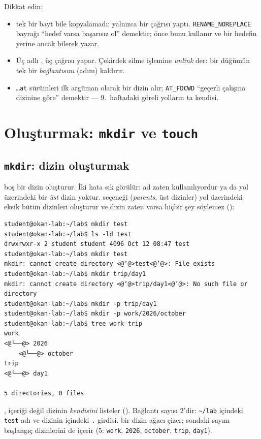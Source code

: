 Dikkat edin:
\begin{itemize}
  \item {} tek bir bayt bile kopyalamadı: yalnızca bir  çağrısı yaptı. \texttt{RENAME\_NOREPLACE} bayrağı ``hedef varsa başarısız ol'' demektir;  önce bunu kullanır ve bir hedefin yerine ancak bilerek yazar.
  \item Üç adlı , üç  çağrısı yapar. Çekirdek silme işlemine \emph{unlink} der: bir düğümün tek bir \emph{bağlantısını} (adını) kaldırır.
  \item \texttt{\dots at} sürümleri ilk argüman olarak bir dizin alır; \texttt{AT\_FDCWD} ``geçerli çalışma dizinine göre'' demektir --- 9.~haftadaki göreli yolların ta kendisi.
\end{itemize}

\section{Oluşturmak: \texttt{mkdir} ve \texttt{touch}}

\subsection{\texttt{mkdir}: dizin oluşturmak}

 boş bir dizin oluşturur. İki hata sık görülür: ad zaten kullanılıyordur ya da yol üzerindeki bir \emph{üst} dizin yoktur.  seçeneği (\emph{parents}, üst dizinler) yol üzerindeki eksik bütün dizinleri oluşturur ve dizin zaten varsa hiçbir şey söylemez ():

\begin{lstlisting}[style=term]
student@okan-lab:~/lab$ mkdir test
student@okan-lab:~/lab$ ls -ld test
drwxrwxr-x 2 student student 4096 Oct 12 08:47 test
student@okan-lab:~/lab$ mkdir test
mkdir: cannot create directory <@‘@>test<@’@>: File exists
student@okan-lab:~/lab$ mkdir trip/day1
mkdir: cannot create directory <@‘@>trip/day1<@’@>: No such file or directory
student@okan-lab:~/lab$ mkdir -p trip/day1
student@okan-lab:~/lab$ mkdir -p work/2026/october
student@okan-lab:~/lab$ tree work trip
work
<@└──@> 2026
    <@└──@> october
trip
<@└──@> day1

5 directories, 0 files
\end{lstlisting}

, içeriği değil dizinin \emph{kendisini} listeler (). Bağlantı sayısı $2$'dir: \texttt{\textasciitilde/lab} içindeki \texttt{test} adı ve dizinin içindeki \texttt{.} girdisi.  bir dizin ağacı çizer; sondaki sayım başlangıç dizinlerini de içerir ($5$: \texttt{work}, \texttt{2026}, \texttt{october}, \texttt{trip}, \texttt{day1}).

